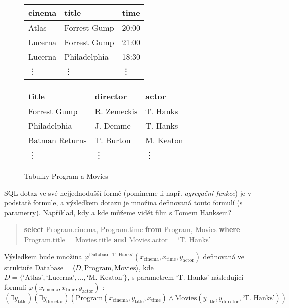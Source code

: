 \begin{figure}[htbp]
\begin{multicols}{2}
    \ttfamily\small
    \begin{tabular}{lll}
        cinema         & title          & time   \\ \hline
        Atlas          & Forrest Gump   & 20:00  \\
        Lucerna        & Forrest Gump   & 21:00  \\
        Lucerna        & Philadelphia   & 18:30  \\
        \vdots         & \vdots         & \vdots
    \end{tabular}

    \begin{tabular}{lll}
        title          & director    & actor \\ \hline
        Forrest Gump   & R. Zemeckis & T. Hanks      \\
        Philadelphia   & J. Demme    & T. Hanks      \\
        Batman Returns & T. Burton   & M. Keaton     \\
        \vdots         & \vdots      & \vdots
    \end{tabular}    
\end{multicols}
\caption{Tabulky Program a Movies}
\label{figure:datbase}
\end{figure}

SQL dotaz ve své nejjednodušší formě (pomineme-li např. \emph{agregační funkce}) je v podstatě formule, a výsledkem dotazu je množina definovaná touto formulí (s parametry). Například, kdy a kde můžeme vidět film s Tomem Hanksem?

\begin{quote}
    \textbf{select} Program.cinema, Program.time \textbf{from} Program, Movies \textbf{where}\\ Program.title = Movies.title  \textbf{and} Movies.actor = `T. Hanks'   
\end{quote}

Výsledkem bude množina $\varphi^{\text{Database},\text{`T. Hanks'}} (x_\mathrm{cinema},x_\mathrm{time},y_\mathrm{actor})$ definovaná ve struktuře $\text{Database}=\langle D, \mathrm{Program}, \mathrm{Movies}\rangle$, kde $D=\{\text{`Atlas'},\text{`Lucerna'},\dots,\text{`M. Keaton'}\}$, s parametrem `T. Hanks' následující formulí $\varphi(x_\mathrm{cinema},x_\mathrm{time},y_\mathrm{actor})$ :
$$
(\exists y_\mathrm{title})(\exists y_\mathrm{director})(\mathrm{Program}(x_\mathrm{cinema},y_\mathrm{title},x_\mathrm{time}) \land \mathrm{Movies}(y_\mathrm{title},y_\mathrm{director},\text{`T. Hanks'}))
$$


